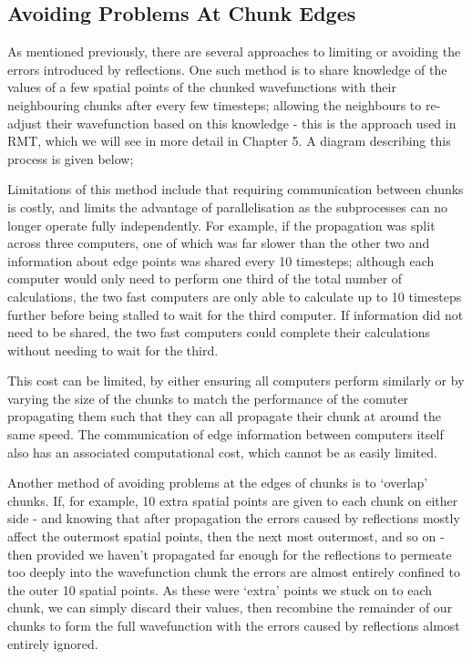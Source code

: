 \subsection{Avoiding Problems At Chunk Edges}
As mentioned previously, there are several approaches to limiting or avoiding the errors introduced by reflections. One such method is to share knowledge of the values of a few spatial points of the chunked wavefunctions with their neighbouring chunks after every few timesteps; allowing the neighbours to re-adjust their wavefunction based on this knowledge - this is the approach used in RMT, which we will see in more detail in Chapter 5. A diagram describing this process is given below;



Limitations of this method include that requiring communication between chunks is costly, and limits the advantage of parallelisation as the subprocesses can no longer operate fully independently. For example, if the propagation was split across three computers, one of which was far slower than the other two and information about edge points was shared every 10 timesteps; although each computer would only need to perform one third of the total number of calculations, the two fast computers are only able to calculate up to 10 timesteps further before being stalled to wait for the third computer. If information did not need to be shared, the two fast computers could complete their calculations without needing to wait for the third. 

This cost can be limited, by either ensuring all computers perform similarly or by varying the size of the chunks to match the performance of the comuter propagating them such that they can all propagate their chunk at around the same speed. The communication of edge information between computers itself also has an associated computational cost, which cannot be as easily limited.


Another method of avoiding problems at the edges of chunks is to `overlap' chunks. If, for example, 10 extra spatial points are given to each chunk on either side - and knowing that after propagation the errors caused by reflections mostly affect the outermost spatial points, then the next most outermost, and so on - then provided we haven't propagated far enough for the reflections to permeate too deeply into the wavefunction chunk the errors are almost entirely confined to the outer 10 spatial points. As these were `extra' points we stuck on to each chunk, we can simply discard their values, then recombine the remainder of our chunks to form the full wavefunction with the errors caused by reflections almost entirely ignored. 

